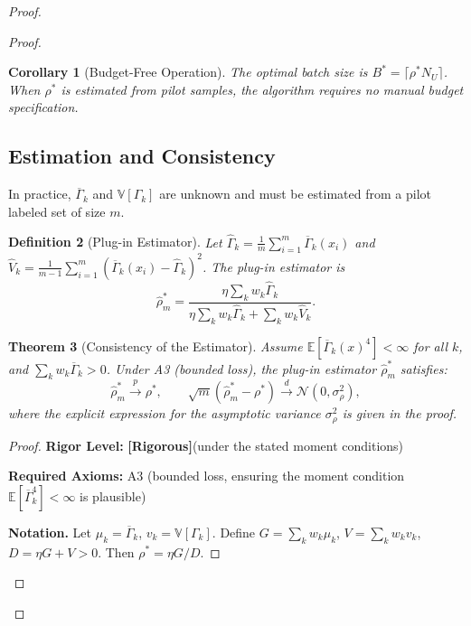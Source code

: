 \documentclass[12pt,a4paper]{article}
\newtheorem{theorem}{Theorem}[section]
\newtheorem{corollary}[theorem]{Corollary}
\newtheorem{definition}[theorem]{Definition}
\newcommand{\E}{\mathbb{E}}
\newcommand{\V}{\mathbb{V}}
\newcommand{\rigorous}{\textbf{[Rigorous]}}
\begin{document}
\begin{proof}
\begin{proof}
\begin{corollary}[Budget-Free Operation]
\label{cor:budget-free}
The optimal batch size is $B^* = \lceil\rho^* N_U\rceil$.  When $\rho^*$ is
estimated from pilot samples, the algorithm requires no manual budget
specification.
\end{corollary}

\subsection{Estimation and Consistency}

In practice, $\overline{\Gamma}_k$ and $\V[\Gamma_k]$ are unknown and must
be estimated from a pilot labeled set of size $m$.

\begin{definition}[Plug-in Estimator]
\label{def:plugin}
Let $\widehat{\Gamma}_k = \frac{1}{m}\sum_{i=1}^m \overline{\Gamma}_k(x_i)$
and $\widehat{V}_k = \frac{1}{m-1}\sum_{i=1}^m
(\overline{\Gamma}_k(x_i)-\widehat{\Gamma}_k)^2$.  The plug-in estimator is
\begin{equation}\label{eq:plugin}
    \hat{\rho}^*_m =
    \frac{\eta\sum_{k} w_k \widehat{\Gamma}_k}
         {\eta\sum_{k} w_k \widehat{\Gamma}_k
          + \sum_{k} w_k \widehat{V}_k}.
\end{equation}
\end{definition}

\begin{theorem}[Consistency of the Estimator]
\label{thm:consistency}
Assume $\E[\overline{\Gamma}_k(x)^4]<\infty$ for all $k$, and $\sum_k w_k\overline{\Gamma}_k>0$.
Under A3 (bounded loss), the plug-in estimator $\hat{\rho}^*_m$ satisfies:
\[
\hat{\rho}^*_m \xrightarrow{p} \rho^*,\qquad
\sqrt{m}(\hat{\rho}^*_m - \rho^*) \xrightarrow{d} \mathcal{N}(0,\sigma^2_\rho),
\]
where the explicit expression for the asymptotic variance $\sigma^2_\rho$ is given in the proof.
\end{theorem}

\begin{proof}
\textbf{Rigor Level:} \rigorous \quad (under the stated moment conditions)

\textbf{Required Axioms:} A3 (bounded loss, ensuring the moment condition $\E[\overline{\Gamma}_k^4]<\infty$ is plausible)

\textbf{Notation.}
Let $\mu_k = \overline{\Gamma}_k$, $v_k = \V[\Gamma_k]$.
Define $G = \sum_k w_k \mu_k$, $V = \sum_k w_k v_k$, $D = \eta G + V > 0$.
Then $\rho^* = \eta G / D$.


\end{proof}
\end{proof}
\end{proof}
\end{document}
